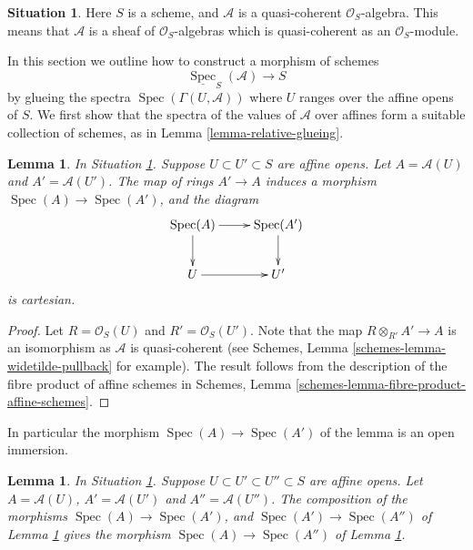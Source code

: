 \documentclass{stacks-project}
\theoremstyle{plain}
\newtheorem{lemma}[subsection]{Lemma}
\theoremstyle{definition}
\newtheorem{situation}[subsection]{Situation}
\theoremstyle{remark}
\numberwithin{equation}{subsection}
\def\Spec{\mathop{\mathrm{Spec}}}
\begin{document}
\begin{situation}
\label{situation-relative-spec}
Here $S$ is a scheme, and $\mathcal{A}$ is a quasi-coherent
$\mathcal{O}_S$-algebra. This means that $\mathcal{A}$ is a
sheaf of $\mathcal{O}_S$-algebras which is quasi-coherent as an
$\mathcal{O}_S$-module.
\end{situation}

\noindent
In this section we outline how to construct a morphism
of schemes
$$
\underline{\Spec}_S(\mathcal{A}) \longrightarrow S
$$
by glueing the spectra $\Spec(\Gamma(U, \mathcal{A}))$
where $U$ ranges over the affine opens of $S$. We first show that the
spectra of the values of $\mathcal{A}$ over affines form a
suitable collection of schemes, as in Lemma \ref{lemma-relative-glueing}.

\begin{lemma}
\label{lemma-spec-inclusion}
In Situation \ref{situation-relative-spec}.
Suppose $U \subset U' \subset S$ are affine opens.
Let $A = \mathcal{A}(U)$ and $A' = \mathcal{A}(U')$.
The map of rings $A' \to A$ induces a morphism
$\Spec(A) \to \Spec(A')$, and the diagram
$$
\xymatrix{
\Spec(A) \ar[r] \ar[d] &
\Spec(A') \ar[d] \\
U \ar[r] &
U'
}
$$
is cartesian.
\end{lemma}

\begin{proof}
Let $R = \mathcal{O}_S(U)$ and $R' = \mathcal{O}_S(U')$.
Note that the map $R \otimes_{R'} A' \to A$ is an isomorphism as
$\mathcal{A}$ is quasi-coherent
(see Schemes, Lemma \ref{schemes-lemma-widetilde-pullback} for example).
The result follows from the description of the fibre product of
affine schemes in
Schemes, Lemma \ref{schemes-lemma-fibre-product-affine-schemes}.
\end{proof}

\noindent
In particular the morphism $\Spec(A) \to \Spec(A')$
of the lemma is an open immersion.

\begin{lemma}
\label{lemma-transitive-spec}
In Situation \ref{situation-relative-spec}.
Suppose $U \subset U' \subset U'' \subset S$ are affine opens.
Let $A = \mathcal{A}(U)$, $A' = \mathcal{A}(U')$ and $A'' = \mathcal{A}(U'')$.
The composition of the morphisms
$\Spec(A) \to \Spec(A')$, and
$\Spec(A') \to \Spec(A'')$ of
Lemma \ref{lemma-spec-inclusion} gives the
morphism $\Spec(A) \to \Spec(A'')$
of Lemma \ref{lemma-spec-inclusion}.
\end{lemma}
\end{document}

